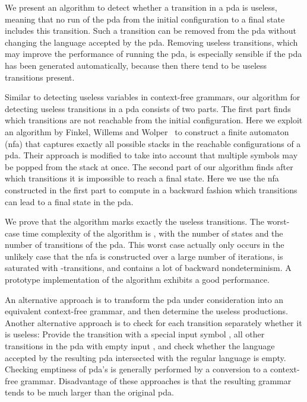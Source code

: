 \documentclass{llncs}
\begin{document}
We present an algorithm to detect whether a transition in a pda is useless,
meaning that no run of the pda from the initial configuration to a final state
includes this transition. Such a transition can be removed from the pda without
changing the language accepted by the pda. Removing useless transitions, which
may improve the performance of running the pda, is especially sensible if
the pda has been generated automatically, because then there tend to be useless
transitions present.

Similar to detecting useless variables in context-free grammars,
our algorithm for detecting useless transitions in a pda consists of
two parts. The first part finds which transitions are not reachable from
the initial configuration.
Here we exploit an algorithm by Finkel, Willems and Wolper~\cite{FinkelWW97}
to construct a finite automaton (nfa) that captures exactly all
possible stacks in the reachable configurations of a pda.
Their approach is modified to take into account that multiple symbols may be popped from
the stack at once. The second part of our algorithm finds after which transitions
it is impossible to reach a final state.  Here we use the nfa
constructed in the first part to compute in a backward fashion which transitions
can lead to a final state in the pda.

We prove that the algorithm marks exactly the useless transitions.
The worst-case time complexity of the algorithm is , with
 the number of states and  the number of transitions of the pda.
This worst case actually only occurs in the unlikely case that the nfa
is constructed over a large number of iterations, is saturated with
-transitions, and contains a lot of backward nondeterminism.
A prototype implementation of the algorithm exhibits a good performance.


An alternative approach is to transform the pda under consideration into an equivalent
context-free grammar, and then determine the useless productions.
Another alternative approach is to check for each transition separately whether it is useless:
Provide the transition with a special input symbol , all other transitions in the pda
with empty input , and check whether the language accepted by the resulting pda intersected
with the regular language  is empty. Checking emptiness of pda's is generally
performed by a conversion to a context-free grammar.
Disadvantage of these approaches is that the resulting grammar tends to be much larger than the original pda.
\end{document}

